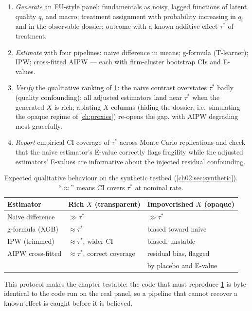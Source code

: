 \begin{enumerate}
\item \emph{Generate} an EU-style panel: fundamentals as noisy, lagged functions of latent
quality $q_i$ and macro; treatment assignment with probability increasing in $q_i$ and in the
observable dossier; outcome with a known additive effect $\tau^*$ of treatment.
\item \emph{Estimate} with four pipelines: naive difference in means; g-formula (T-learner);
IPW; cross-fitted AIPW --- each with firm-cluster bootstrap CIs and E-values.
\item \emph{Verify} the qualitative ranking of \cref{chca:tab:synth}: the naive contrast
overstates $\tau^*$ badly (quality confounding); all adjusted estimators land near $\tau^*$ when
the generated $X$ is rich; ablating $X$ columns (hiding the dossier, i.e.\ simulating the opaque
regime of \cref{ch:proxies}) re-opens the gap, with AIPW degrading most gracefully.
\item \emph{Report} empirical CI coverage of $\tau^*$ across Monte Carlo replications and check
that the naive estimator's E-value correctly flags fragility while the adjusted estimators'
E-values are informative about the injected residual confounding.
\end{enumerate}

\begin{table}[htbp]
\centering
\caption{Expected qualitative behaviour on the synthetic testbed
(\cref{ch02:sec:synthetic}). ``$\approx$'' means CI covers $\tau^*$ at
nominal rate.}
\label{chca:tab:synth}
\small
\begin{tabular}{@{}lll@{}}
\toprule
Estimator & Rich $X$ (transparent) & Impoverished $X$ (opaque) \\
\midrule
Naive difference & $\gg \tau^*$ & $\gg \tau^*$ \\
g-formula (XGB) & $\approx \tau^*$ & biased toward naive \\
IPW (trimmed) & $\approx \tau^*$, wider CI & biased, unstable \\
AIPW cross-fitted & $\approx \tau^*$, correct coverage & residual bias,
flagged \\
 & & by placebo and E-value \\
\bottomrule
\end{tabular}
\end{table}

This protocol makes the chapter testable: the code that must reproduce \cref{chca:tab:synth} is
byte-identical to the code run on the real panel, so a pipeline that cannot recover a known
effect is caught before it is believed.

